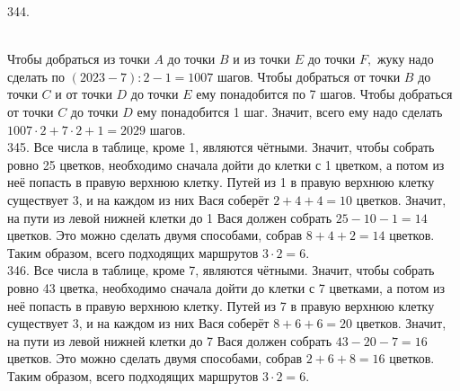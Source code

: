 \documentclass[12pt]{article}
\begin{document}
344. \begin{figure}[ht!]
\end{figure}\\
Чтобы добраться из точки $A$ до точки $B$ и из точки $E$ до точки $F,$ жуку надо сделать по $(2023-7):2-1=1007$ шагов. Чтобы добраться от точки $B$ до точки $C$ и от точки $D$ до точки $E$ ему понадобится по 7 шагов. Чтобы добраться от точки $C$ до точки $D$ ему понадобится 1 шаг. Значит, всего ему надо сделать $1007\cdot2+7\cdot2+1=2029$ шагов.\\
345. Все числа в таблице, кроме 1, являются чётными. Значит, чтобы собрать ровно 25 цветков, необходимо сначала дойти до клетки с 1 цветком, а потом из неё попасть в правую верхнюю клетку. Путей из 1 в правую верхнюю клетку существует 3, и на каждом из них Вася соберёт $2+4+4=10$ цветков. Значит, на пути из левой нижней клетки до 1 Вася должен собрать $25-10-1=14$ цветков. Это можно сделать двумя способами, собрав $8+4+2=14$ цветков. Таким образом, всего подходящих маршрутов $3\cdot2=6.$\\
346. Все числа в таблице, кроме 7, являются чётными. Значит, чтобы собрать ровно 43 цветка, необходимо сначала дойти до клетки с 7 цветками, а потом из неё попасть в правую верхнюю клетку. Путей из 7 в правую верхнюю клетку существует 3, и на каждом из них Вася соберёт $8+6+6=20$ цветков. Значит, на пути из левой нижней клетки до 7 Вася должен собрать $43-20-7=16$ цветков. Это можно сделать двумя способами, собрав $2+6+8=16$ цветков. Таким образом, всего подходящих маршрутов $3\cdot2=6.$\\
\end{document}
